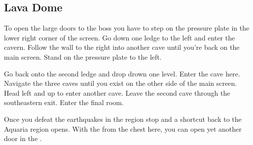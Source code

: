 \subsection{Lava Dome}
\label{map:lava_dome}

To open the large doors to the boss you have to step on the pressure plate in the lower right corner of the screen. Go down one ledge to the left and enter the cavern. Follow the wall to the right into another cave until you're back on the main screen. Stand on the pressure plate to the left.

Go back onto the second ledge and drop drown one level. Enter the cave here. Navigate the three caves until you exist on the other side of the main screen. Head left and up to enter another cave. Leave the second cave through the southeastern exit. Enter the final room.

Once you defeat  the earthquakes in the region stop and a shortcut back to the Aquaria region opens. With the  from the chest here, you can open yet another door in the .


